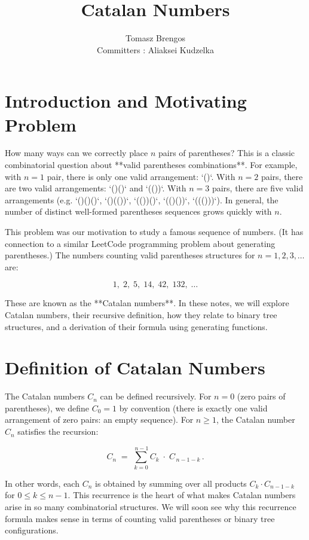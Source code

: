 \documentclass[docmute]{article}
\title{Catalan Numbers}
\author{Tomasz Brengos \\  
Committers : Aliaksei Kudzelka}
\date{}
\begin{document}
\maketitle
\section{Introduction and Motivating Problem}

How many ways can we correctly place $n$ pairs of parentheses? This is a classic combinatorial question about **valid parentheses combinations**. For example, with $n=1$ pair, there is only one valid arrangement: `()`. With $n=2$ pairs, there are two valid arrangements: `()()` and `(())`. With $n=3$ pairs, there are five valid arrangements (e.g. `()()()`, `()(())`, `(())()`, `(()())`, `((()))`). In general, the number of distinct well-formed parentheses sequences grows quickly with $n$. 

This problem was our motivation to study a famous sequence of numbers. (It has connection to a similar LeetCode programming problem about generating parentheses.) The numbers counting valid parentheses structures for $n=1,2,3,\dots$ are:

\[1,\; 2,\; 5,\; 14,\; 42,\; 132,\;\dots\]

These are known as the **Catalan numbers**. In these notes, we will explore Catalan numbers, their recursive definition, how they relate to binary tree structures, and a derivation of their formula using generating functions.

\section{Definition of Catalan Numbers}

The Catalan numbers $C_n$ can be defined recursively. For $n=0$ (zero pairs of parentheses), we define $C_0 = 1$ by convention (there is exactly one valid arrangement of zero pairs: an empty sequence). For $n\ge 1$, the Catalan number $C_n$ satisfies the recursion:

\[
C_n \;=\; \sum_{k=0}^{\,n-1} C_k \;\cdot\; C_{\,n-1-k}\,.
\]

In other words, each $C_n$ is obtained by summing over all products $C_k \cdot C_{n-1-k}$ for $0 \le k \le n-1$. This recurrence is the heart of what makes Catalan numbers arise in so many combinatorial structures. We will soon see why this recurrence formula makes sense in terms of counting valid parentheses or binary tree configurations.
\end{document}
